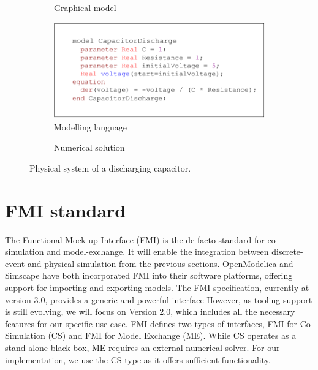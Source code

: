 \documentclass[conference]{IEEEtran}
\begin{document}
\begin{figure}[htbp]
  \centering
  \begin{subfigure}[b]{\linewidth}
    \centering
    
    \caption{Graphical model}
    \label{cd:graphical-model}
  \end{subfigure}
  
  \vspace{1em}
  
  \begin{subfigure}[b]{\linewidth}
    \centering
    \includegraphics[width=0.9\linewidth]{images/capacitor-discharge-code.drawio.pdf}
    \caption{Modelling language}
    \label{cd:modeling-language}
  \end{subfigure}
  
  \vspace{1em}
  
  \begin{subfigure}[b]{\linewidth}
    \centering
    
    \caption{Numerical solution}
    \label{cd:numerical-solution}
  \end{subfigure}
  
  \caption{Physical system of a discharging capacitor.}
  \label{capacitor-discharge}
\end{figure}

\section{FMI standard}

The Functional Mock-up Interface (FMI) is the de facto standard for co-simulation and model-exchange.
It will enable the integration between discrete-event and physical simulation from the previous sections.
OpenModelica and Simscape have both incorporated FMI into their software platforms, offering support for importing and exporting models.
The FMI specification, currently at version 3.0, provides a generic and powerful interface
However, as tooling support is still evolving, we will focus on Version 2.0, which includes all the necessary features for our specific use-case.
FMI defines two types of interfaces, FMI for Co-Simulation (CS) and FMI for Model Exchange (ME).
While CS operates as a stand-alone black-box, ME requires an external numerical solver.
For our implementation, we use the CS type as it offers sufficient functionality.
\end{document}
